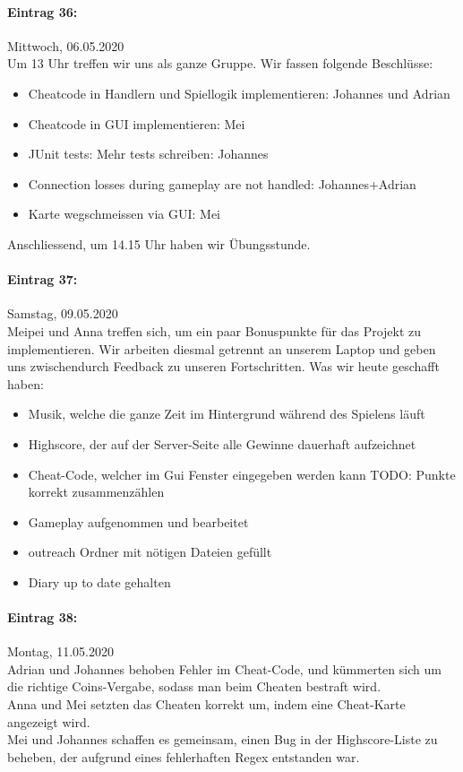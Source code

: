 \documentclass[12pt]{article}
\begin{document}
\paragraph{Eintrag 36:}
Mittwoch, 06.05.2020\\
Um 13 Uhr treffen wir uns als ganze Gruppe. Wir fassen folgende Beschl\"usse:
\begin{itemize}
\item Cheatcode in Handlern und Spiellogik implementieren: Johannes und Adrian
\item Cheatcode in GUI implementieren: Mei
\item JUnit tests: Mehr tests schreiben: Johannes
\item Connection losses during gameplay are not handled: Johannes+Adrian
\item Karte wegschmeissen via GUI: Mei
\end{itemize}

\noindent Anschliessend, um 14.15 Uhr haben wir \"Ubungsstunde.

\paragraph{Eintrag 37:}
Samstag, 09.05.2020\\
Meipei und Anna treffen sich, um ein paar Bonuspunkte f\"ur das Projekt zu implementieren. Wir arbeiten diesmal getrennt an unserem Laptop und geben uns zwischendurch Feedback zu unseren Fortschritten. Was wir heute geschafft haben:
\begin{itemize}
\item Musik, welche die ganze Zeit im Hintergrund w\"ahrend des Spielens l\"auft
\item Highscore, der auf der Server-Seite alle Gewinne dauerhaft aufzeichnet
\item Cheat-Code, welcher im Gui Fenster eingegeben werden kann TODO: Punkte korrekt zusammenz\"ahlen
\item Gameplay aufgenommen und bearbeitet
\item outreach Ordner mit n\"otigen Dateien gef\"ullt
\item Diary up to date gehalten
\end{itemize}

\paragraph{Eintrag 38:}
Montag, 11.05.2020\\
Adrian und Johannes behoben Fehler im Cheat-Code, und k\"ummerten sich um die richtige Coins-Vergabe, sodass man beim Cheaten bestraft wird.\\
Anna und Mei setzten das Cheaten korrekt um, indem eine Cheat-Karte angezeigt wird.\\
Mei und Johannes schaffen es gemeinsam, einen Bug in der Highscore-Liste zu beheben, der aufgrund eines fehlerhaften Regex entstanden war.
\end{document}
